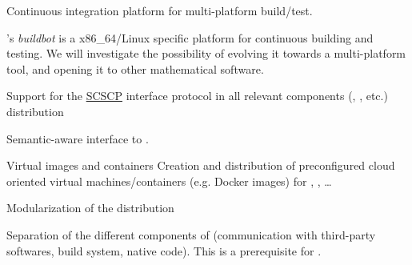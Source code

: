 \begin{workpackage}[id=component-architecture,wphases=3-24!.5,
  title=Component Architecture,lead=UV,
  PSRM=24,UVRM=1,SARM=1, USHRM=4]
\begin{wpdelivs}
\begin{wpdeliv}[due=24,id=portability-cygwin64,dissem=PU,nature=DEM]
    \end{wpdeliv}

    \begin{wpdeliv}[due=36,id=multiplatform-buildbot,dissem=PP,nature=P]
      {Continuous integration platform for multi-platform build/test.}

      \Sage's \emph{buildbot} is a x86\_64/Linux specific platform for
      continuous building and testing. We will investigate the
      possibility of evolving it towards a multi-platform tool, and
      opening it to other mathematical software.
    \end{wpdeliv}%
    \begin{wpdeliv}[due=24,id=scscp-sage,dissem=PU,nature=O]
      {Support for the \href{http://www.symbolic-computing.org/}{SCSCP} interface protocol
        in all relevant components (\Sage, \GAP, etc.) distribution}
    \end{wpdeliv}

    \begin{wpdeliv}[due=48,id=semantic-interface-sage-gap,dissem=PU,nature=O]
      {Semantic-aware \Sage interface to \GAP.}
    \end{wpdeliv}
    \begin{wpdeliv}[due=12,id=virtual-machines,dissem=PU,nature=O]
      {Virtual images and containers} Creation and distribution of
      preconfigured cloud oriented virtual machines/containers
      (e.g. Docker images) for \PariGP, \Sage, \dots
    \end{wpdeliv}

    \begin{wpdeliv}[due=24,id=sage-modularization,dissem=PU,nature=O]
      {Modularization of the \Sage distribution}

      Separation of the different components of \Sage (communication
      with third-party softwares, build system, \Sage native
      code). This is a prerequisite for .
    \end{wpdeliv}


\end{wpdelivs}
\end{workpackage}
